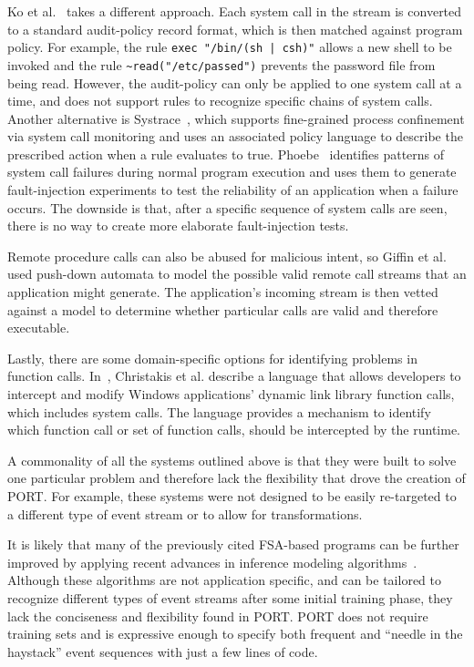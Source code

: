 Ko et al.~\cite{DBLP:conf/acsac/KoFL94} 
takes a different approach.
Each system call in the
stream is converted to a standard audit-policy record format, which is then
matched against program policy. For example,
the rule \lstinline+exec "/bin/(sh | csh)"+ allows a new shell to be invoked and the rule
\lstinline+~read("/etc/passed")+ prevents the password file from being read.
However, the audit-policy can only be applied to
one system call at a time,
and does not support rules to recognize specific chains of system calls.
Another alternative is
Systrace~\cite{DBLP:conf/uss/Provos03},
which
supports fine-grained process confinement
via system call monitoring and uses an associated policy language 
to describe the prescribed action when a rule evaluates to true.
Phoebe~\cite{DBLP:journals/corr/abs-2006-04444}
identifies patterns of system call failures during normal program execution
and uses them to generate fault-injection experiments
to test the reliability of an application when a failure occurs.
The downside is that, after a specific sequence of system calls are seen, there is no way to create more elaborate fault-injection
tests.

Remote procedure calls can also be abused for malicious
intent,
so Giffin et al. ~\cite{DBLP:conf/uss/GiffinJM02} used
push-down automata to model the possible valid
remote call streams that an application might generate.
The application's incoming stream 
is then vetted against a model
to determine whether particular calls are valid and therefore executable.

Lastly, there are some domain-specific options for
identifying problems
in function calls.
In~\cite{DBLP:conf/icse/ChristakisEG017}, Christakis et al. describe a language that allows developers to intercept and modify
Windows applications’ dynamic link library function calls, which includes system
calls. The language provides a mechanism to identify which
function call or set of function calls, should be
intercepted by the runtime.

A commonality
of all the systems
outlined above
is that they were built to solve one particular problem
and
therefore lack the flexibility that drove the creation of PORT.
For example, these systems were not designed to be easily re-targeted
to a different type of event stream or to allow for transformations.

It is likely that many of the previously cited FSA-based programs can be further improved by applying recent advances in inference modeling algorithms~\cite{MarianiPS17,WalkinshawTD13,EmamM18,BeschastnikhBEK14}. Although these algorithms are not application specific, and can be tailored to recognize different types of event streams after some initial training phase, they lack the conciseness and flexibility found in PORT. PORT does not require training sets and is expressive enough to specify both frequent and  “needle in the haystack” event sequences with just a few lines of code.


